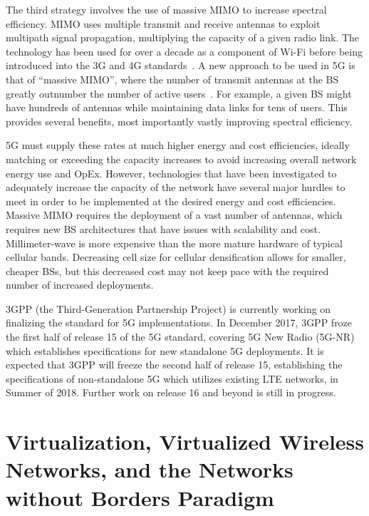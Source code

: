 \documentclass[12pt,dvipsnames]{report}
\begin{document}
The third strategy involves the use of massive MIMO to increase spectral efficiency.  MIMO uses multiple transmit and receive antennas to exploit multipath signal propagation, multiplying the capacity of a given radio link.  The technology has been used for over a decade as a component of Wi-Fi before being introduced into the 3G and 4G standards~\cite{6824752}.  A new approach to be used in 5G is that of ``massive MIMO'', where the number of transmit antennas at the BS greatly outnumber the number of active users~\cite{5595728}.  For example, a given BS might have hundreds of antennas while maintaining data links for tens of users.  This provides several benefits, most importantly vastly improving spectral efficiency.

5G must supply these rates at much higher energy and cost efficiencies, ideally matching or exceeding the capacity increases to avoid increasing overall network energy use and OpEx.  However, technologies that have been investigated to adequately increase the capacity of the network have several major hurdles to meet in order to be implemented at the desired energy and cost efficiencies.  Massive MIMO requires the deployment of a vast number of antennas, which requires new BS architectures that have issues with scalability and cost.  Millimeter-wave is more expensive than the more mature hardware of typical cellular bands.  Decreasing cell size for cellular densification allows for smaller, cheaper BSs, but this decreased cost may not keep pace with the required number of increased deployments.~\cite{6824752}

3GPP (the Third-Generation Partnership Project) is currently working on finalizing the standard for 5G implementations.  In December 2017, 3GPP froze the first half of release 15 of the 5G standard, covering 5G New Radio (5G-NR) which establishes specifications for new standalone 5G deployments.  It is expected that 3GPP will freeze the second half of release 15, establishing the specifications of non-standalone 5G which utilizes existing LTE networks, in Summer of 2018.  Further work on release 16 and beyond is still in progress.

\section{Virtualization, Virtualized Wireless Networks, and the Networks without Borders Paradigm} \label{sec:virtualization}
\end{document}
